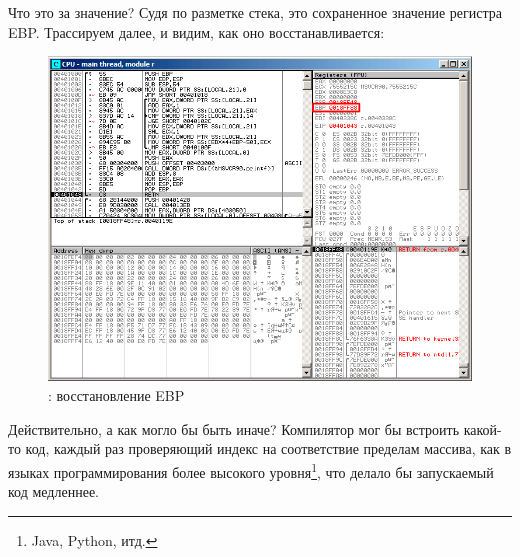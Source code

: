 Что это за значение? 
Судя по разметке стека, это сохраненное значение регистра EBP.
\clearpage
Трассируем далее, и видим, как оно восстанавливается:

\begin{figure}[H]
\centering
\includegraphics[scale=\FigScale]{patterns/13_arrays/2_BO/olly_r2.png}
\caption{\olly: восстановление EBP}
\label{fig:array_BO_olly_r2}
\end{figure}

Действительно, а как могло бы быть иначе? Компилятор мог бы встроить какой-то код, 
каждый раз проверяющий индекс на соответствие пределам массива, как в языках программирования 
более высокого уровня\footnote{Java, Python, итд.}, что делало бы запускаемый код медленнее.

